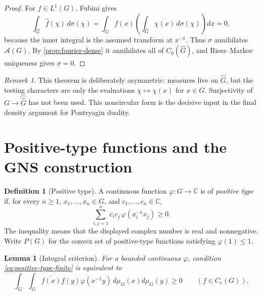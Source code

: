 \documentclass[11pt]{article}
\newtheorem{lemma}[theorem]{Lemma}
\theoremstyle{definition}
\newtheorem{definition}[theorem]{Definition}
\theoremstyle{remark}
\newtheorem{remark}[theorem]{Remark}
\newcommand{\C}{\mathbb C}
\newcommand{\Cc}{C_{\mathrm c}}
\newcommand{\Czero}{C_0}
\newcommand{\Lp}[1]{L^{#1}}
\newcommand{\dual}[1]{\widehat{#1}}
\newcommand{\bidual}[1]{\widehat{\widehat{#1}}}
\begin{document}
\begin{proof}
For $f\in\Lp1(G)$, Fubini gives
\[
 \int_{\dual G}\widehat f(\chi)\,d\sigma(\chi)
 =\int_G f(x)\left(\int_{\dual G}\overline{\chi(x)}\,d\sigma(\chi)\right)dx=0,
\]
because the inner integral is the assumed transform at $x^{-1}$.  Thus $\sigma$
annihilates $\mathcal A(G)$.  By \cref{prop:fourier-dense} it annihilates all of
$\Czero(\dual G)$, and Riesz--Markov uniqueness gives $\sigma=0$.
\end{proof}

\begin{remark}
\label{rem:noncircular-uniqueness}
This theorem is deliberately asymmetric: measures live on $\dual G$, but the testing
characters are only the evaluations $\chi\mapsto\chi(x)$ for $x\in G$.  Surjectivity of
$G\to\bidual G$ has not been used.  This noncircular form is the decisive input in the
final density argument for Pontryagin duality.
\end{remark}

\section{Positive-type functions and the GNS construction}
\label{sec:positive-type}

\begin{definition}[Positive type]
\label{def:positive-type}
A continuous function $\varphi:G\to\C$ is of \emph{positive type} if, for every
$n\geq1$, $x_1,\ldots,x_n\in G$, and $c_1,\ldots,c_n\in\C$,
\begin{equation}
  \sum_{i,j=1}^n\overline{c_i}c_j\,
     \varphi(x_i^{-1}x_j)\geq0.
  \label{eq:positive-type-finite}
\end{equation}
The inequality means that the displayed complex number is real and nonnegative.
Write $P(G)$ for the convex set of positive-type functions satisfying
$\varphi(1)\leq1$.
\end{definition}

\begin{lemma}[Integral criterion]
\label{lem:positive-integral-criterion}
For a bounded continuous $\varphi$, condition
\eqref{eq:positive-type-finite} is equivalent to
\begin{equation}
  \int_G\int_G \overline{f(x)}f(y)\varphi(x^{-1}y)
       \,d\mu_G(x)d\mu_G(y)\geq0
  \qquad(f\in\Cc(G)).
  \label{eq:positive-type-integral}
\end{equation}
\end{lemma}
\end{document}
